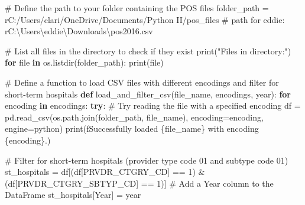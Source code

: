 \documentclass[
  letterpaper,
  DIV=11,
  numbers=noendperiod]{scrartcl}
\newenvironment{Shaded}{\begin{snugshade}}{\end{snugshade}}
\newcommand{\BuiltInTok}[1]{\textcolor[rgb]{0.00,0.23,0.31}{#1}}
\newcommand{\CommentTok}[1]{\textcolor[rgb]{0.37,0.37,0.37}{#1}}
\newcommand{\ControlFlowTok}[1]{\textcolor[rgb]{0.00,0.23,0.31}{\textbf{#1}}}
\newcommand{\DecValTok}[1]{\textcolor[rgb]{0.68,0.00,0.00}{#1}}
\newcommand{\KeywordTok}[1]{\textcolor[rgb]{0.00,0.23,0.31}{\textbf{#1}}}
\newcommand{\NormalTok}[1]{\textcolor[rgb]{0.00,0.23,0.31}{#1}}
\newcommand{\OperatorTok}[1]{\textcolor[rgb]{0.37,0.37,0.37}{#1}}
\newcommand{\SpecialCharTok}[1]{\textcolor[rgb]{0.37,0.37,0.37}{#1}}
\newcommand{\SpecialStringTok}[1]{\textcolor[rgb]{0.13,0.47,0.30}{#1}}
\newcommand{\StringTok}[1]{\textcolor[rgb]{0.13,0.47,0.30}{#1}}
\newcommand{\VerbatimStringTok}[1]{\textcolor[rgb]{0.13,0.47,0.30}{#1}}
\begin{document}
\begin{Shaded}
\begin{Highlighting}[]
\CommentTok{\# Define the path to your folder containing the POS files}
\NormalTok{folder\_path }\OperatorTok{=} \VerbatimStringTok{r\textquotesingle{}C:/Users/clari/OneDrive/Documents/Python II/pos\_files\textquotesingle{}}
\CommentTok{\# path for eddie: r\textquotesingle{}C:\textbackslash{}Users\textbackslash{}eddie\textbackslash{}Downloads\textbackslash{}pos2016.csv\textquotesingle{}}

\CommentTok{\# List all files in the directory to check if they exist}
\BuiltInTok{print}\NormalTok{(}\StringTok{"Files in directory:"}\NormalTok{)}
\ControlFlowTok{for} \BuiltInTok{file} \KeywordTok{in}\NormalTok{ os.listdir(folder\_path):}
    \BuiltInTok{print}\NormalTok{(}\BuiltInTok{file}\NormalTok{)}

\CommentTok{\# Define a function to load CSV files with different encodings and filter for short{-}term hospitals}
\KeywordTok{def}\NormalTok{ load\_and\_filter\_csv(file\_name, encodings, year):}
    \ControlFlowTok{for}\NormalTok{ encoding }\KeywordTok{in}\NormalTok{ encodings:}
        \ControlFlowTok{try}\NormalTok{:}
            \CommentTok{\# Try reading the file with a specified encoding}
\NormalTok{            df }\OperatorTok{=}\NormalTok{ pd.read\_csv(os.path.join(folder\_path, file\_name),}
\NormalTok{                             encoding}\OperatorTok{=}\NormalTok{encoding, engine}\OperatorTok{=}\StringTok{\textquotesingle{}python\textquotesingle{}}\NormalTok{)}
            \BuiltInTok{print}\NormalTok{(}\SpecialStringTok{f\textquotesingle{}Successfully loaded }\SpecialCharTok{\{}\NormalTok{file\_name}\SpecialCharTok{\}}\SpecialStringTok{ with encoding }\SpecialCharTok{\{}\NormalTok{encoding}\SpecialCharTok{\}}\SpecialStringTok{.\textquotesingle{}}\NormalTok{)}

            \CommentTok{\# Filter for short{-}term hospitals (provider type code 01 and subtype code 01)}
\NormalTok{            st\_hospitals }\OperatorTok{=}\NormalTok{ df[(df[}\StringTok{\textquotesingle{}PRVDR\_CTGRY\_CD\textquotesingle{}}\NormalTok{] }\OperatorTok{==} \DecValTok{1}\NormalTok{) }\OperatorTok{\&}
\NormalTok{                              (df[}\StringTok{\textquotesingle{}PRVDR\_CTGRY\_SBTYP\_CD\textquotesingle{}}\NormalTok{] }\OperatorTok{==} \DecValTok{1}\NormalTok{)]}
            \CommentTok{\# Add a \textquotesingle{}Year\textquotesingle{} column to the DataFrame}
\NormalTok{            st\_hospitals[}\StringTok{\textquotesingle{}Year\textquotesingle{}}\NormalTok{] }\OperatorTok{=}\NormalTok{ year}


\end{Highlighting}
\end{Shaded}
\end{document}
